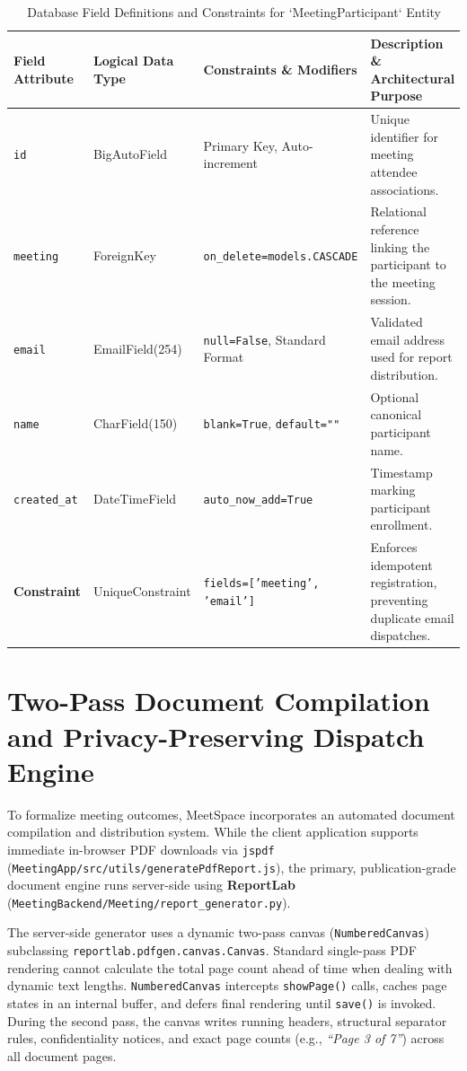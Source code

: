 \documentclass[12pt,oneside,letterpaper]{report}
\numberwithin{equation}{chapter} %
\begin{document}
\begin{table}[H]
\centering
\caption{Database Field Definitions and Constraints for `MeetingParticipant` Entity}
\label{tab:model_participant}
\footnotesize
\begin{tabularx}{\textwidth}{p{3.2cm}p{2.5cm}p{3.2cm}X}
\toprule
\textbf{Field Attribute} & \textbf{Logical Data Type} & \textbf{Constraints \& Modifiers} & \textbf{Description \& Architectural Purpose} \\
\midrule
\texttt{id} & BigAutoField & Primary Key, Auto-increment & Unique identifier for meeting attendee associations. \\
\texttt{meeting} & ForeignKey & \texttt{on\_delete=models.CASCADE} & Relational reference linking the participant to the meeting session. \\
\texttt{email} & EmailField(254) & \texttt{null=False}, Standard Format & Validated email address used for report distribution. \\
\texttt{name} & CharField(150) & \texttt{blank=True}, \texttt{default=""} & Optional canonical participant name. \\
\texttt{created\_at} & DateTimeField & \texttt{auto\_now\_add=True} & Timestamp marking participant enrollment. \\
\textbf{Constraint} & UniqueConstraint & \texttt{fields=['meeting', 'email']} & Enforces idempotent registration, preventing duplicate email dispatches. \\
\bottomrule
\end{tabularx}
\end{table}

\section{Two-Pass Document Compilation and Privacy-Preserving Dispatch Engine}
To formalize meeting outcomes, MeetSpace incorporates an automated document compilation and distribution system. While the client application supports immediate in-browser PDF downloads via \texttt{jspdf} (\texttt{MeetingApp/src/utils/generatePdfReport.js}), the primary, publication-grade document engine runs server-side using \textbf{ReportLab} (\texttt{MeetingBackend/Meeting/report\_generator.py}).

The server-side generator uses a dynamic two-pass canvas (\texttt{NumberedCanvas}) subclassing \texttt{reportlab.pdfgen.canvas.Canvas}. Standard single-pass PDF rendering cannot calculate the total page count ahead of time when dealing with dynamic text lengths. \texttt{NumberedCanvas} intercepts \texttt{showPage()} calls, caches page states in an internal buffer, and defers final rendering until \texttt{save()} is invoked. During the second pass, the canvas writes running headers, structural separator rules, confidentiality notices, and exact page counts (e.g., \textit{``Page 3 of 7''}) across all document pages.
\end{document}
